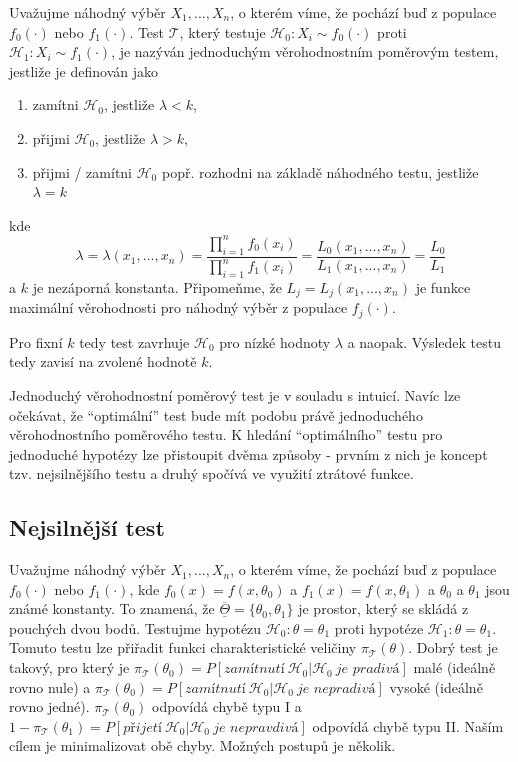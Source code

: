 \begin{definition}
Uvažujme náhodný výběr $X_1, ..., X_n$, o kterém víme, že pochází buď z populace $f_0(\cdot)$ nebo $f_1(\cdot)$. Test $\mathscr{T}$, který testuje $\mathscr{H}_0: X_i \sim f_0(\cdot)$ proti $\mathscr{H}_1: X_i \sim f_1(\cdot)$, je nazýván jednoduchým věrohodnostním poměrovým testem, jestliže je definován jako
\begin{enumerate}
\item zamítni $\mathscr{H}_0$, jestliže $\lambda < k$,
\item přijmi $\mathscr{H}_0$, jestliže $\lambda > k$,
\item přijmi / zamítni $\mathscr{H}_0$ popř. rozhodni na základě náhodného testu, jestliže $\lambda = k$
\end{enumerate}
kde
\begin{equation*}
\lambda = \lambda(x_1, ..., x_n) = \frac{\prod_{i = 1}^n f_0(x_i)}{\prod_{i = 1}^n f_1(x_i)} = \frac{L_0(x_1, ..., x_n)}{L_1(x_1, ..., x_n)} = \frac{L_0}{L_1}
\end{equation*}
a $k$ je nezáporná konstanta. Připomeňme, že $L_j = L_j(x_1, ..., x_n)$ je funkce maximální věrohodnosti pro náhodný výběr z populace $f_j(\cdot)$.
\end{definition}

Pro fixní $k$ tedy test zavrhuje $\mathscr{H}_0$ pro nízké hodnoty $\lambda$ a naopak. Výsledek testu tedy zavisí na zvolené hodnotě $k$.

Jednoduchý věrohodnostní poměrový test je v souladu s intuicí. Navíc lze očekávat, že ``optimální'' test bude mít podobu právě jednoduchého věrohodnostního poměrového testu. K hledání ``optimálního'' testu pro jednoduché hypotézy lze přistoupit dvěma způsoby - prvním z nich je koncept tzv. nejsilnějšího testu a druhý spočívá ve využití ztrátové funkce.

\subsection{Nejsilnější test}

Uvažujme náhodný výběr $X_1, ..., X_n$, o kterém víme, že pochází buď z populace $f_0(\cdot)$ nebo $f_1(\cdot)$, kde $f_0(x) = f(x, \theta_0)$ a $f_1(x) = f(x, \theta_1)$ a $\theta_0$ a $\theta_1$ jsou známé konstanty. To znamená, že $\overline{\underline{\Theta}} = \{\theta_0, \theta_1\}$ je prostor, který se skládá z pouchých dvou bodů. Testujme hypotézu $\mathscr{H}_0: \theta = \theta_1$ proti hypotéze $\mathscr{H}_1: \theta = \theta_1$. Tomuto testu lze přiřadit funkci charakteristické veličiny $\pi_{\mathscr{T}}(\theta)$. Dobrý test je takový, pro který je $\pi_{\mathscr{T}}(\theta_0) = P[\textit{zamítnutí} ~ \mathscr{H}_0|\mathscr{H}_0 ~ \textit{je pradivá}]$ malé (ideálně rovno nule) a $\pi_{\mathscr{T}}(\theta_0) = P[\textit{zamítnutí} ~ \mathscr{H}_0|\mathscr{H}_0 ~ \textit{je nepradivá}]$ vysoké (ideálně rovno jedné).  $\pi_{\mathscr{T}}(\theta_0)$ odpovídá chybě typu I a $1 - \pi_{\mathscr{T}}(\theta_1) = P[\textit{přijetí} ~ \mathscr{H}_0 | \mathscr{H}_0 ~ \textit{je nepravdivá}]$ odpovídá chybě typu II. Naším cílem je minimalizovat obě chyby. Možných postupů je několik.

